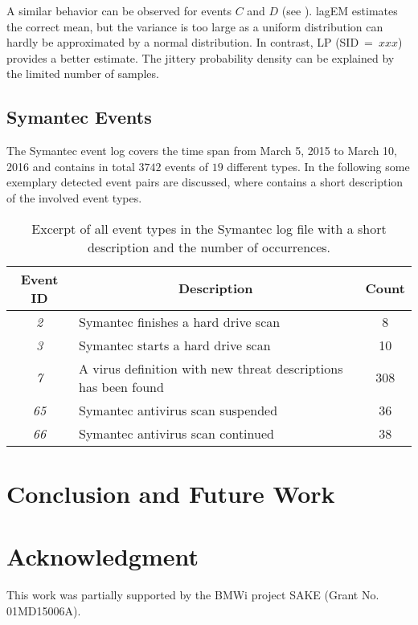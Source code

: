 \documentclass[journal, 10pt]{IEEEtran}
\begin{document}
A similar behavior can be observed for events $C$ and $D$ (see \Fig{}). lagEM estimates the correct mean, but the variance is too large as a uniform distribution can hardly be approximated by a normal distribution. %
In contrast, LP (SID~=~$xxx$) provides a better estimate. The jittery probability density can be explained by the limited number of samples.

\subsection{Symantec Events}
\label{sec:results_symantec}
%
The Symantec event log covers the time span from March 5, 2015 to March 10, 2016 and contains in total $3742$ events of $19$ different types. 
In the following some exemplary detected event pairs are discussed, where  contains a short description of the involved event types. 

\begin{table}[!ht]
	\caption{Excerpt of all event types in the Symantec log file with a short description and the number of occurrences.}
	\label{tab:symantecEvents}

	\centering
	\begin{tabular}{c p{} c}
		Event ID & \multicolumn{1}{c}{Description} & Count \\
		\hline
		\textit{2}	& Symantec finishes a hard drive scan & 8 \\
		\textit{3}	& Symantec starts a hard drive scan & 10 \\
		\textit{7}	& A virus definition with new threat descriptions has been found & 308 \\
		\textit{65}	& Symantec antivirus scan suspended & 36 \\
		\textit{66}	& Symantec antivirus scan continued & 38 \\
	\end{tabular}

\end{table}

\section{Conclusion and Future Work}
\label{sec:conclusion}
%


\appendices
\section*{Acknowledgment}
This work was partially supported by the BMWi project SAKE (Grant No. 01MD15006A).
\end{document}
